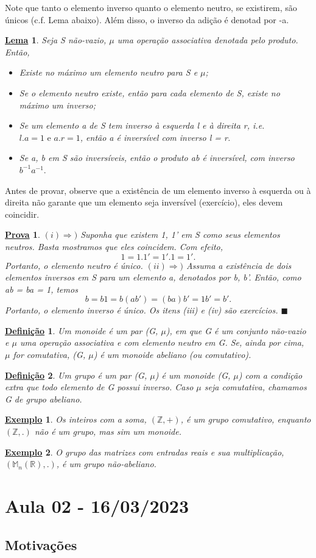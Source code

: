 \documentclass{article}
\newtheorem*{def*}{\underline{Defini\c c\~ao}}
\newtheorem{example*}{\underline{Exemplo}}
\newtheorem*{proof*}{\underline{Prova}}
\newtheorem*{lemma*}{\underline{Lema}}
\renewcommand\qedsymbol{$\blacksquare$}
\begin{document}
  Note que tanto o elemento inverso quanto o elemento neutro, se existirem, s\~ao \'unicos (c.f. Lema abaixo). Al\'em disso, o inverso da adi\c c\~ao \'e
denotad por -a.
\begin{lemma*}
  Seja S n\~ao-vazio, $\mu$ uma opera\c c\~ao associativa denotada pelo produto. Ent\~ao, 
 \begin{itemize}
   \item[i)] Existe no m\'aximo um elemento neutro para S e $\mu$;
   \item[ii)] Se o elemento neutro existe, ent\~ao para cada elemento de S, existe no m\'aximo um inverso;
   \item[iii)] Se um elemento a de S tem inverso \`a esquerda l e \`a direita r, i.e. $l.a = 1 \text{ e } a.r = 1$, ent\~ao
a \'e invers\'ivel com inverso l = r.
   \item[iv)] Se a, b em S s\~ao invers\'iveis, ent\~ao o produto ab \'e invers\'ivel, com inverso $b^{-1}a^{-1}.$
 \end{itemize}
\end{lemma*}
  Antes de provar, observe que a exist\^encia de um elemento inverso \`a esquerda ou \`a direita n\~ao garante que um elemento
seja invers\'ivel (exerc\'icio), eles devem coincidir.
\begin{proof*}
 $(i)\Rightarrow)$ Suponha que existem 1, 1' em S como seus elementos neutros. Basta mostramos que eles coincidem. Com efeito,
 $$
    1 = 1.1' = 1'.1 = 1'.
 $$
 Portanto, o elemento neutro \'e \'unico.
 $(ii)\Rightarrow)$ Assuma a exist\^encia de dois elementos inversos em S para um elemento a, denotados por b, b'. Ent\~ao, como
ab = ba = 1, temos
  $$
    b = b1 = b(ab') = (ba)b' = 1b' = b'.
  $$
  Portanto, o elemento inverso \'e \'unico. Os itens (iii) e (iv) s\~ao exerc\'icios. \qedsymbol
\end{proof*}
  
 \begin{def*}
   Um monoide \'e um par (G, $\mu$), em que G \'e um conjunto n\~ao-vazio e $\mu$ uma opera\c c\~ao associativa e com elemento neutro em G.
  Se, ainda por cima, $\mu$ for comutativa, (G, $\mu$) \' e um monoide abeliano (ou comutativo).
 \end{def*}
 \begin{def*}
   Um grupo \'e um par (G, $\mu$) \'e um monoide (G, $\mu$) com a condi\c c\~ao extra que todo elemento de G possui inverso. Caso
 $\mu$ seja comutativa, chamamos G de grupo abeliano.
 \end{def*}
\begin{example*}
  Os inteiros com a soma, $(\mathbb{Z}, +)$, \'e um grupo comutativo, enquanto $(\mathbb{Z}, .)$ n\~ao \'e um grupo, mas sim um monoide.
\end{example*}
\begin{example*}
  O grupo das matrizes com entradas reais e sua multiplica\c c\~ao, $(\mathbb{M}_{n}(\mathbb{R}), .)$, \'e um grupo n\~ao-abeliano.
\end{example*}

\section{Aula 02 - 16/03/2023}
\subsection{Motiva\c c\~oes}
 
\end{document}
